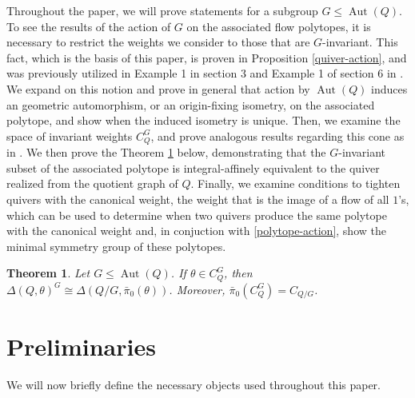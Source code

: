 \documentclass[12pt]{amsart}
\theoremstyle{plain}
\newtheorem{theorem}{Theorem}[section]
\theoremstyle{definition}
\DeclareMathOperator{\aut}{Aut}
\begin{document}
Throughout the paper, we will prove statements for a subgroup $G \leq \aut(Q)$. To see the results of the action of $G$ on the associated flow polytopes, it is necessary to restrict the weights we consider to those that are $G$-invariant. This fact, which is the basis of this paper, is proven in Proposition \ref{quiver-action}, and was previously utilized in Example 1 in section 3 and Example 1 of section 6 in \cite{hille2003quivers}.  We expand on this notion and prove in general that action by $\aut(Q)$ induces an geometric automorphism, or an origin-fixing isometry, on the associated polytope, and show when the induced isometry is unique. Then, we examine the space of invariant weights $C_Q^G$, and prove analogous results regarding this cone as in \cite{hille2003quivers}. We then prove the Theorem \ref{thm:quotient-graph-correspondence} below, demonstrating that the $G$-invariant subset of the associated polytope is integral-affinely equivalent to the quiver realized from the quotient graph of $Q$. Finally, we examine conditions to tighten quivers with the canonical weight, the weight that is the image of a flow of all $1$'s, which can be used to determine when two quivers produce the same polytope with the canonical weight and, in conjuction with \ref{polytope-action}, show the minimal symmetry group of these polytopes.

\begin{theorem} \label{thm:quotient-graph-correspondence}
    Let $G \leq \aut(Q)$. If $\theta \in C_Q^G$, then $\Delta(Q, \theta)^G \cong \Delta(Q/G, \bar\pi_0(\theta))$. Moreover, $\bar\pi_0(C_Q^G) = C_{Q/G}$.
\end{theorem}

\section{Preliminaries}
We will now briefly define the necessary objects used throughout this paper. 
\end{document}

